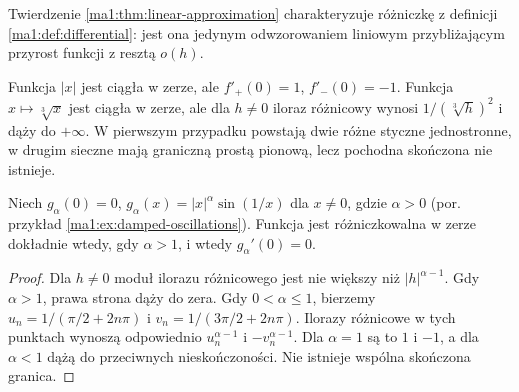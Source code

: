 Twierdzenie \ref{ma1:thm:linear-approximation} charakteryzuje różniczkę z definicji \ref{ma1:def:differential}: jest ona jedynym odwzorowaniem liniowym przybliżającym przyrost funkcji z resztą $o(h)$.

\begin{przyklad}
\label{ma1:ex:nondifferentiability}
Funkcja $|x|$ jest ciągła w zerze, ale $f'_+(0)=1$, $f'_-(0)=-1$. Funkcja $x\mapsto\sqrt[3]x$ jest ciągła w zerze, ale dla $h\ne0$ iloraz różnicowy wynosi $1/(\sqrt[3]h)^2$ i dąży do $+\infty$. W pierwszym przypadku powstają dwie różne styczne jednostronne, w drugim sieczne mają graniczną prostą pionową, lecz pochodna skończona nie istnieje.
\end{przyklad}
\begin{przyklad}
\label{ma1:ex:oscillating-derivative-at-zero}
Niech $g_\alpha(0)=0$, $g_\alpha(x)=|x|^\alpha\sin(1/x)$ dla $x\ne0$, gdzie $\alpha>0$ (por. przykład \ref{ma1:ex:damped-oscillations}). Funkcja jest różniczkowalna w zerze dokładnie wtedy, gdy $\alpha>1$, i wtedy $g_\alpha'(0)=0$.
\end{przyklad}
\begin{proof}
Dla $h\ne0$ moduł ilorazu różnicowego jest nie większy niż $|h|^{\alpha-1}$. Gdy $\alpha>1$, prawa strona dąży do zera. Gdy $0<\alpha\le1$, bierzemy $u_n=1/(\pi/2+2n\pi)$ i $v_n=1/(3\pi/2+2n\pi)$. Ilorazy różnicowe w tych punktach wynoszą odpowiednio $u_n^{\alpha-1}$ i $-v_n^{\alpha-1}$. Dla $\alpha=1$ są to $1$ i $-1$, a dla $\alpha<1$ dążą do przeciwnych nieskończoności. Nie istnieje wspólna skończona granica.
\end{proof}

